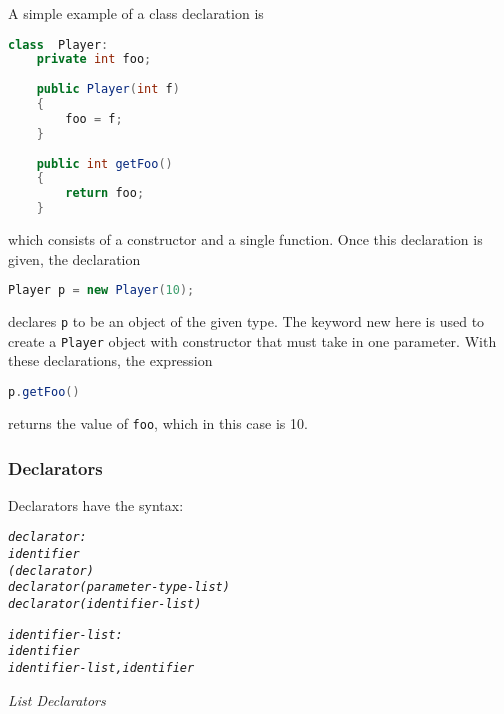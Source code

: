 \documentclass[12pt]{report}
\begin{document}
A simple example of a class declaration is

\begin{singlespace}
\begin{lstlisting}[language=Java,label=some-code,caption=Class declaration]
class  Player: 
	private int foo;
	
	public Player(int f)
	{
		foo = f;
	}
	
	public int getFoo()
	{
		return foo;
	}
\end{lstlisting}
\end{singlespace}

which consists of a constructor and a single function. Once this declaration is given, the declaration

\begin{singlespace}
\begin{lstlisting}[language=Java,label=some-code,caption=Object declaration]
Player p = new Player(10);
\end{lstlisting}
\end{singlespace}

declares \texttt{p} to be an object of the given type. The keyword new here is used to create a \texttt{Player} object with constructor that must take in one parameter. With these declarations, the expression

\begin{singlespace}
\begin{lstlisting}[language=Java,label=some-code,caption=Returns foo]
p.getFoo()
\end{lstlisting}
\end{singlespace}

returns the value of \texttt{foo}, which in this case is 10. 

\subsubsection{Declarators}

Declarators have the syntax:

\begin{alltt}\begin{singlespace}
         \textit{declarator:}
              \textit{identifier}
              \textit{( declarator )}
              \textit{declarator ( parameter-type-list )}
              \textit{declarator ( identifier-list )}
              
         \textit{identifier-list:}
              \textit{identifier}
              \textit{identifier-list, identifier}\end{singlespace}
\end{alltt}
\textit{List Declarators}
\end{document}
